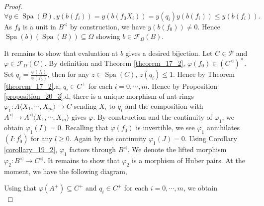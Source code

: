 \documentclass[10pt]{article}
\numberwithin{equation}{section}
\theoremstyle{definition}
\DeclareMathOperator{\Spa}{Spa}
\newcommand{\cF}[0]{\mathcal{F}}
\newcommand{\comppol}[1]{\langle X_1,\cdots, X_{#1}\rangle}
\begin{document}
\begin{proof}
\begin{equation*}
        \forall y\in \Spa(B), y(b(f_i)) = y(b(f_0X_i)) = y(q_i)y(b(f_i))\leq y(b(f_i)).
    \end{equation*}
    As $f_0$ is a unit in $B^\triangleleft$ by construction, we have $y(b(f_0))\not=0$. Hence $\Spa(b)(\Spa(B))\subseteq\Omega$ showing $b\in\cF_\Omega(B)$.
    \par It remains to show that evaluation at $b$ gives a desired bijection. Let $C\in\mathcal{P}$ and $\varphi\in\cF_\Omega(C)$. By definition and Theorem \ref{theorem_17_2}, $\varphi(f_0)\in (C^\triangleleft)^\times$. Set $q_i = {\frac {\varphi(f_i)}{\varphi(f_0)}}$, then for any $z\in\Spa(C)$, $z(q_i)\leq 1$. Hence by Theorem \ref{theorem_17_2}.a, $q_i\in C^+$ for each $i=0,\cdots,m$.
    Hence by Proposition \ref{proposition_20_3}.d, there is a unique morphism of nat-rings $\varphi_1:A\comppol{m}\to C$ sending $X_i$ to $q_i$ and the composition with $A^\triangleleft\to A^\triangleleft\comppol{m}$ gives $\varphi$. By construction and the continuity of $\varphi_1$, we obtain $\varphi_1(I)=0$.
    Recalling that $\varphi(f_0)$ is invertible, we see $\varphi_1$ annihilates $(I:f_0^l)$ for any $l\geq0$. Again by the continuity $\varphi_1(J)=0$. Using Corollary \ref{corollary_19_2}, $\varphi_1$ factors through $B^\triangleleft$. We denote the lifted morphism $\varphi_2:B^\triangleleft\to C^\triangleleft$. It remains to show that $\varphi_2$ is a morphism of Huber pairs. At the moment, we have the following diagram,
    \begin{center}
    \end{center}
    Using that $\varphi(A^+)\subseteq C^+$ and $q_i\in C^+$ for each $i=0,\cdots,m$, we obtain
    \begin{equation*}

\end{equation*}
\end{proof}
\end{document}
